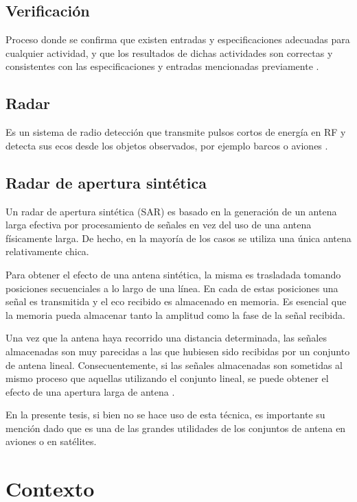 \subsection{Verificación}

Proceso donde se confirma que existen entradas y especificaciones adecuadas para cualquier actividad,
y que los resultados de dichas actividades son correctas y consistentes con las especificaciones y entradas mencionadas 
previamente \cite{Division2009}.

\subsection{Radar}

Es un sistema de radio detección que transmite pulsos cortos de energía en RF y detecta sus ecos desde los objetos observados,
por ejemplo barcos o aviones \cite{Standard1996}.

\subsection{Radar de apertura sintética}

Un radar de apertura sintética (SAR) es basado en la generación de un antena larga efectiva por procesamiento de señales en
vez del uso de una antena físicamente larga. De hecho, en la mayoría de los casos se utiliza una única antena relativamente 
chica.

Para obtener el efecto de una antena sintética, la misma es trasladada tomando posiciones secuenciales a lo largo de una línea. 
En cada de estas posiciones una señal es transmitida y el eco recibido es almacenado en memoria. Es esencial que la memoria
pueda almacenar tanto la amplitud como la fase de la señal recibida.

Una vez que la antena haya recorrido una distancia determinada, las señales almacenadas son muy parecidas a las que hubiesen
sido recibidas por un conjunto de antena lineal. Consecuentemente, si las señales almacenadas son sometidas al mismo proceso que
aquellas utilizando el conjunto lineal, se puede obtener el efecto de una apertura larga de antena \cite{Skolnik1990}.  

En la presente tesis, si bien no se hace uso de esta técnica, es importante su mención dado que es una de las grandes utilidades 
de los conjuntos de antena en aviones o en satélites.

\section{Contexto} \label{sc:context}

